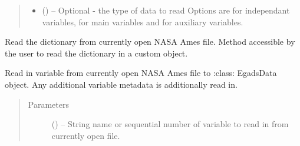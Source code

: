 \documentclass[a4paper,10pt,openany,english]{sphinxmanual}
\begin{document}
\begin{fulllineitems}
\begin{fulllineitems}
\begin{quote}
\begin{description}
\begin{itemize}
\item {} 
 () -- Optional - the type of data to read
Options are  for independant variables,  for main variables
and  for auxiliary variables.

\end{itemize}

\end{description}\end{quote}

\end{fulllineitems}


\begin{fulllineitems}
\label{egadsapi:egads.input.nasa_ames_io.NasaAmes.read_na_dict}
Read the dictionary from currently open NASA Ames file. Method accessible by
the user to read the dictionary in a custom object.

\end{fulllineitems}


\begin{fulllineitems}
\label{egadsapi:egads.input.nasa_ames_io.NasaAmes.read_variable}
Read in variable from currently open NASA Ames file to :class: EgadsData
object. Any additional variable metadata is additionally read in.
\begin{quote}\begin{description}
\item[{Parameters}] \leavevmode
{} () -- String name or sequential number of variable to read in from currently
open file.

\end{description}\end{quote}

\end{fulllineitems}



\end{fulllineitems}
\end{document}
